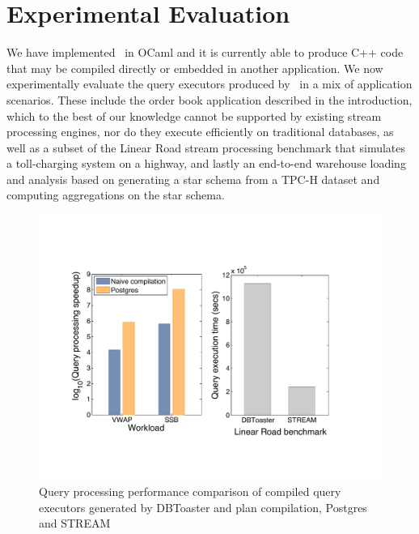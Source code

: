 
\section{Experimental Evaluation}

We have implemented \compiler\ in OCaml and it is currently able to produce C++
code that may be compiled directly or embedded in another application. We now
experimentally evaluate the query executors produced by \compiler\ in a mix of
application scenarios. These include the order book application described in the
introduction, which to the best of our knowledge cannot be supported by existing
stream processing engines, nor do they execute efficiently on traditional
databases, as well as a subset of the Linear Road stream processing benchmark
that simulates a toll-charging system on a highway, and lastly an end-to-end
warehouse loading and analysis based on generating a star schema from a TPC-H
dataset and computing aggregations on the star schema.


\begin{figure}[tb]
\begin{center}
\includegraphics[scale=0.4]{../plots/toaster_comparison.pdf}
\end{center}
\vspace{-4mm}
\caption{Query processing performance comparison of compiled query executors
generated by DBToaster and plan compilation, Postgres and STREAM}
\label{fig:dbtperf}
\end{figure}

